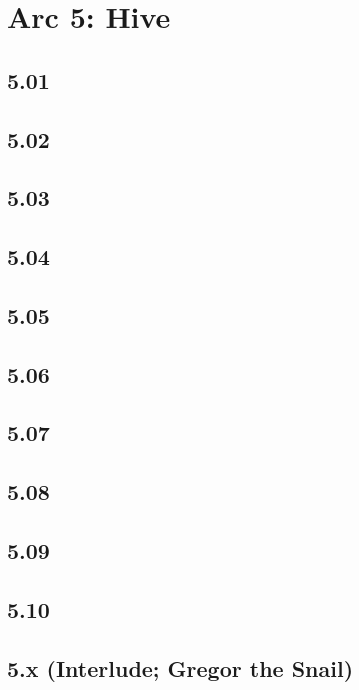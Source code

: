 \part*{Arc 5: Hive}
 \chapter*{5.01}
 \chapter*{5.02}
 \chapter*{5.03}
 \chapter*{5.04}
 \chapter*{5.05}
 \chapter*{5.06}
 \chapter*{5.07}
 \chapter*{5.08}
 \chapter*{5.09}
 \chapter*{5.10}
 \chapter*{5.x (Interlude; Gregor the Snail)}












